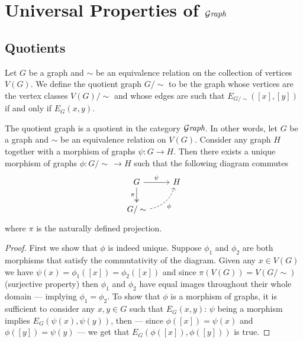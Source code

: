 \section{Universal Properties of \texorpdfstring{\({\mathcal{G}\textit{raph}}\)}{Graph}}

\subsection{Quotients}

\begin{definition}[Quotient]\label{def: quotient-graph}
  Let \(G\) be a graph and \(\sim\) be an equivalence relation on the collection
  of vertices \(V(G)\). We define the quotient graph \(G/\sim\) to be the graph
  whose vertices are the vertex classes \(V(G)/\sim\) and whose edges are
  such that \(E_{G/\sim}([x], [y])\) if and only if \(E_G(x, y)\).
\end{definition}

\begin{proposition}
  \label{prop: quotient-graph}
  The quotient graph is a quotient in the category \({\mathcal{G}\textit{raph}}\). In other words,
  let \(G\) be a graph and \(\sim\) be an equivalence relation on \(V(G)\).
  Consider any graph \(H\) together with a morphism of graphs \(\psi: G \to H\).
  Then there exists a unique morphism of graphs \(\phi: G/\sim\, \to H\) such
  that the following diagram commutes
  \[
    \begin{tikzcd}
      G \ar[d, two heads, swap, "\pi"] \ar[r, "\psi"] &H \\
      G/\sim \ar[ur, swap, bend right, dashed, "\phi"] &
    \end{tikzcd}
  \]
  where \(\pi\) is the naturally defined projection.
\end{proposition}

\begin{proof}
  First we show that \(\phi\) is indeed unique. Suppose \(\phi_1\) and
  \(\phi_2\) are both morphisms that satisfy the commutativity of the diagram.
  Given any \(x \in V(G)\) we have \(\psi(x) = \phi_1([x]) = \phi_2([x])\) and
  since \(\pi(V(G)) = V(G/\sim)\) (surjective property) then \(\phi_1\) and
  \(\phi_2\) have equal images throughout their whole domain --- implying
  \(\phi_1 = \phi_2\). To show that \(\phi\) is a morphism of graphs, it is
  sufficient to consider any \(x, y \in G\) such that \(E_G(x, y)\): \(\psi\)
  being a morphism implies \(E_G(\psi(x), \psi(y))\), then --- since \(\phi([x])
  = \psi(x)\) and \(\phi([y]) = \psi(y)\) --- we get that \(E_G(\phi([x]),
  \phi([y]))\) is true.
\end{proof}

